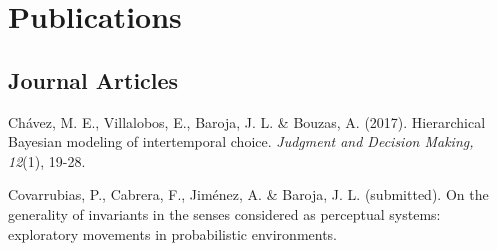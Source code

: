\documentclass[letterpaper]{article}
\renewenvironment{itemize}{
  \begin{list}{}{
    \setlength{\leftmargin}{1.5em}
  }
}{
  \end{list}
}
\begin{document}
\section*{Publications}



 \subsection*{Journal Articles}
\begin{itemize}
\setlength\itemsep{-.25em}
\setlength{\itemindent}{-.125in}
	\item Chávez, M. E., Villalobos, E., Baroja, J. L. \& Bouzas, A. (2017). Hierarchical Bayesian modeling of intertemporal choice. \emph{Judgment and Decision Making, 12}(1), 19-28.
	\item Covarrubias, P., Cabrera, F., Jiménez, A. \& Baroja, J. L. (submitted). On the generality of invariants in the senses considered as perceptual systems: exploratory movements in probabilistic environments.
\end{itemize}
\end{document}
